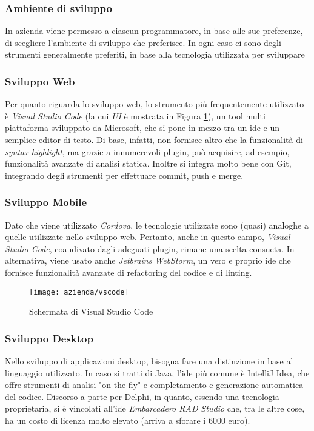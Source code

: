 \subsubsection{Ambiente di sviluppo}
In azienda viene permesso a ciascun programmatore, in base alle sue preferenze, di scegliere l'ambiente di sviluppo che preferisce. In ogni caso ci sono degli strumenti generalmente preferiti, in base alla tecnologia utilizzata per sviluppare

\subsubsection{Sviluppo Web}
Per quanto riguarda lo sviluppo web, lo strumento più frequentemente utilizzato è \textit{Visual Studio Code} (la cui \textit{UI} è mostrata in Figura \ref{figura:vs-code}), un tool multi piattaforma sviluppato da Microsoft, che si pone in mezzo tra un \gls{ide} e un semplice editor di testo. Di base, infatti, non fornisce altro che la funzionalità di \textit{syntax highlight}, ma grazie a innumerevoli plugin, può acquisire, ad esempio, funzionalità avanzate di analisi statica. Inoltre si integra molto bene con Git, integrando degli strumenti per effettuare commit, push e merge.

\subsubsection{Sviluppo Mobile}
Dato che viene utilizzato \textit{Cordova}, le tecnologie utilizzate sono (quasi) analoghe a quelle utilizzate nello sviluppo web. Pertanto, anche in questo campo, \textit{Visual Studio Code}, coaudivato dagli adeguati plugin, rimane una scelta consueta. In alternativa, viene usato anche \textit{Jetbrains WebStorm}, un vero e proprio \gls{ide} che fornisce funzionalità avanzate di refactoring del codice e di linting.

\begin{figure}[!h] 
	\centering 
	\texttt{[image: azienda/vscode]} 
	\caption{Schermata di Visual Studio Code}
	\label{figura:vs-code}
\end{figure}

\subsubsection{Sviluppo Desktop}
Nello sviluppo di applicazioni desktop, bisogna fare una distinzione in base al linguaggio utilizzato. In caso si tratti di Java, l'\gls{ide} più comune è IntelliJ Idea, che offre strumenti di analisi "on-the-fly" e completamento e generazione automatica del codice. Discorso a parte per Delphi, in quanto, essendo una tecnologia proprietaria, si è vincolati all'\gls{ide} \textit{Embarcadero RAD Studio} che, tra le altre cose, ha un costo di licenza molto elevato (arriva a sforare i 6000 euro).

